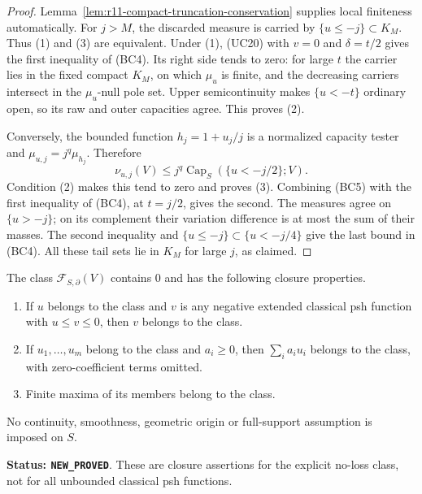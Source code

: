 \begin{proof}
Lemma~\ref{lem:r11-compact-truncation-conservation} supplies local
finiteness automatically. For $j>M$, the discarded measure is
carried by $\{u\leq-j\}\subset K_M$. Thus (1) and (3) are
equivalent. Under (1), (UC20) with $v=0$ and $\delta=t/2$
gives the first inequality of (BC4). Its right side tends to zero:
for large $t$ the carrier lies in the fixed compact $K_M$, on
which $\mu_u$ is finite, and the decreasing carriers intersect
in the $\mu_u$-null pole set. Upper semicontinuity makes
$\{u<-t\}$ ordinary open, so its raw and outer capacities agree.
This proves (2).

Conversely, the bounded function $h_j=1+u_j/j$ is a normalized
capacity tester and $\mu_{u,j}=j^q\mu_{h_j}$. Therefore
\[
 \nu_{u,j}(V)
    \leq j^q\operatorname{Cap}_S(\{u<-j/2\};V).
 \tag{BC5}
\]
Condition (2) makes this tend to zero and proves (3).
Combining (BC5) with the first inequality of (BC4), at $t=j/2$,
gives the second. The measures agree on $\{u>-j\}$; on its
complement their variation difference is at most the sum of their
masses. The second inequality and
$\{u\leq-j\}\subset\{u<-j/4\}$ give the last bound in
(BC4). All these tail sets lie in $K_M$ for large $j$, as claimed.
\end{proof}

\begin{theorem}
\label{thm:r11-solid-boundary-cone}
The class $\mathcal F_{S,\partial}(V)$ contains $0$ and has the
following closure properties.
\begin{enumerate}
\item If $u$ belongs to the class and $v$ is any negative extended
classical psh function with $u\leq v\leq0$, then $v$ belongs
to the class.
\item If $u_1,\ldots,u_m$ belong to the class and $a_i\geq0$,
then $\sum_i a_i u_i$ belongs to the class, with zero-coefficient
terms omitted.
\item Finite maxima of its members belong to the class.
\end{enumerate}
No continuity, smoothness, geometric origin or full-support
assumption is imposed on $S$.
\end{theorem}

\noindent\textbf{Status: \texttt{NEW\_PROVED}}. These are
closure assertions for the explicit no-loss class, not for all
unbounded classical psh functions.


